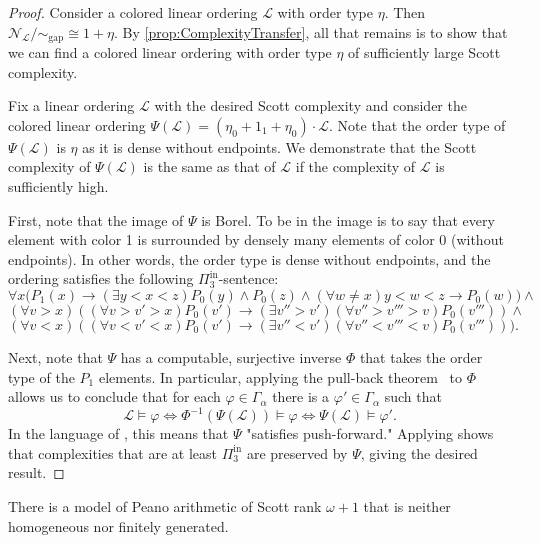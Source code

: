 \documentclass[11pt]{amsart}
\newcommand{\N}{\mathcal{N}}
\newcommand{\mc}[1]{\mathcal{#1}}
\newcommand{\Pinf}[1]{\Pi^{\mathrm{in}}_{#1}}
\def\N{{\mathcal N}}
\theoremstyle{remark}
\begin{document}
\begin{proof}
	Consider a colored linear ordering $\mc{L}$ with order type $\eta$. Then $\N_\mc{L}{/}{\sim_\text{gap}}\cong 1+\eta$.
    By \cref{prop:ComplexityTransfer}, all that remains is to show that we can find a colored linear ordering with order type $\eta$ of sufficiently large Scott complexity.

    Fix a linear ordering $\mc{L}$ with the desired Scott complexity and consider the colored linear ordering $\Psi(\mc{L})=(\eta_0+1_1+\eta_0)\cdot \mc{L}$.
    Note that the order type of $\Psi(\mc{L})$ is $\eta$ as it is dense without endpoints.
    We demonstrate that the Scott complexity of $\Psi(\mc{L})$ is the same as that of $\mc{L}$ if the complexity of $\mc{L}$ is sufficiently high.
    
    First, note that the image of $\Psi$ is Borel.
    To be in the image is to say that every element with color 1 is surrounded by densely many elements of color 0 (without endpoints).
    In other words, the order type is dense without endpoints, and the ordering satisfies the following $\Pinf{3}$-sentence:
    \[\forall x \big(P_1(x) \to (\exists y<x<z) P_0(y)\land P_0(z)\land (\forall w\neq x)  y<w<z\to P_0(w)\big)\land\]
    \[ (\forall v>x)  ((\forall v>v'>x) P_0(v')\to (\exists v''>v')  (\forall v''>v'''>v)  P_0(v''') ) \land \]
    \[ (\forall v<x ) ((\forall v<v'<x)  P_0(v')\to (\exists v''<v')  (\forall v''<v'''<v ) P_0(v''') )\big). \]
    
		Next, note that $\Psi$ has a computable, surjective inverse $\Phi$ that takes the order type of the $P_1$ elements.
        In particular, applying the pull-back theorem~\cite[Theorem XI.7]{MBook} to $\Phi$ allows us to conclude that for each $\varphi\in\Gamma_\alpha$ there is a $\varphi'\in\Gamma_\alpha$ such that
        \[\mc{L}\models\varphi \iff \Phi^{-1}(\Psi(\mc{L}))\models \varphi\iff \Psi(\mc{L})\models \varphi'.\]
        In the language of \cite[Proposition 2.21]{GR23}, this means that $\Psi$ "satisfies push-forward."
	Applying \cite[Proposition 2.21]{GR23} shows that complexities that are at least $\Pinf{3}$ are preserved by $\Psi$, giving the desired result.
    
\end{proof}

\begin{proposition}\label{prop:pinfomega2nohom}
    There is a model of Peano arithmetic of Scott rank $\omega+1$ that is neither homogeneous nor finitely generated.
\end{proposition}
\end{document}
